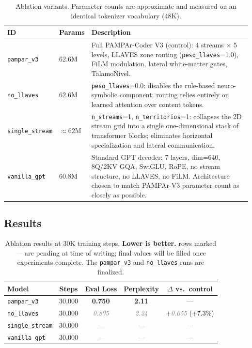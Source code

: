 \documentclass[11pt,a4paper]{article}
\newcommand{\placeholder}[1]{\textcolor{gray}{\textit{#1}}}
\begin{document}
\begin{table}[h]
\centering
\begin{tabular}{llp{7.2cm}}
\toprule
\textbf{ID} & \textbf{Params} & \textbf{Description} \\
\midrule
\texttt{pampar\_v3}     & 62.6M & Full PAMPAr-Coder V3 (control): 4 streams ×
5 levels, LLAVES zone routing (\texttt{peso\_llaves}=1.0), FiLM modulation,
lateral white-matter gates, TalamoNivel. \\[4pt]
\texttt{no\_llaves}     & 62.6M & \texttt{peso\_llaves}=0.0: disables the
rule-based neuro-symbolic component; routing relies entirely on learned
attention over content tokens. \\[4pt]
\texttt{single\_stream} & $\approx$62M & \texttt{n\_streams}=1,
\texttt{n\_territorios}=1: collapses the 2D stream grid into a single
one-dimensional stack of transformer blocks; eliminates horizontal
specialization and lateral communication. \\[4pt]
\texttt{vanilla\_gpt}   & 60.8M & Standard GPT decoder: 7 layers, dim=640,
8Q/2KV GQA, SwiGLU, RoPE, no stream structure, no LLAVES, no FiLM.
Architecture chosen to match PAMPAr-V3 parameter count as closely as
possible. \\
\bottomrule
\end{tabular}
\caption{Ablation variants.  Parameter counts are approximate and measured
on an identical tokenizer vocabulary (48K).}
\label{tab:ablation_variants}
\end{table}

\subsection{Results}

\begin{table}[h]
\centering
\begin{tabular}{lcccc}
\toprule
\textbf{Model} & \textbf{Steps} & \textbf{Eval Loss} & \textbf{Perplexity} &
\textbf{$\Delta$ vs.\ control} \\
\midrule
\texttt{pampar\_v3}     & 30,000 & \textbf{0.750} & \textbf{2.11} & --- \\
\texttt{no\_llaves}     & 30,000 & \placeholder{0.805} & \placeholder{2.24} & $+$\placeholder{0.055}
    (+7.3\%) \\
\texttt{single\_stream} & 30,000 & \placeholder{---}   & \placeholder{---}  & --- \\
\texttt{vanilla\_gpt}   & 30,000 & \placeholder{---}   & \placeholder{---}  & --- \\
\bottomrule
\end{tabular}
\caption{Ablation results at 30K training steps.  \textbf{Lower is better.}
rows marked \placeholder{---} are pending at time of writing; final values will
be filled once experiments complete.  The \texttt{pampar\_v3} and
\texttt{no\_llaves} runs are finalized.}
\label{tab:ablation_results}
\end{table}
\end{document}
